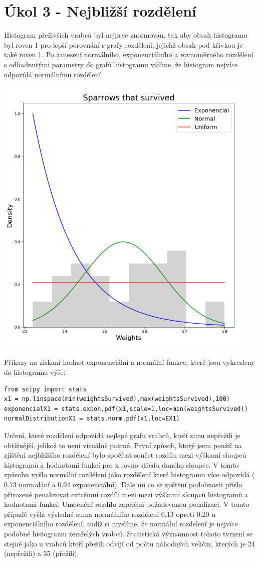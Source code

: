 \documentclass[12pt,a4paper]{article}
\begin{document}
\section{Úkol 3 - Nejbližší rozdělení}
Histogram přeživších vrabců byl nejprve znormován, tak aby obsah histogramu byl roven 1 pro lepší porovnání s grafy rozdělení, jejichž obsah pod křivkou je také roven 1. Po zanesení normálního, exponenciálního a rovnoměrného rozdělení s odhadnutými parametry do grafů histogramu vidíme, že histogram nejvíce odpovídá normálnímu rozdělení.
\begin{center}
\includegraphics[width=5in]{3_survived}
\end{center}
Příkazy na získaní hodnot exponenciální a normální funkce, které jsou vykresleny do histogramu výše:\par \medskip
\begin{lstlisting}
from scipy import stats
x1 = np.linspace(min(weightsSurvived),max(weightsSurvived),100)
exponencialX1 = stats.expon.pdf(x1,scale=1,loc=min(weightsSurvived))
normalDistributionX1 = stats.norm.pdf(x1,loc=EX1)
\end{lstlisting}
\pagebreak
Určení, které rozdělení odpovídá nejlepé grafu vrabců, kteří zimu nepřežili je obtížnější, jelikož to není visuálně patrné. První způsob, který jsem použil na zjištění nejbližšího rozdělení bylo spočítat součet rozdílu mezi výškami sloupců histogramů a hodnotami funkcí pro x rovno středu daného sloupce. V tomto způsobu vyšlo normální rozdělení jako rozdělení které histogramu více odpovídá ( 0.73 normalání a 0.94 exponenciální). Dále mi co se zjištění podobnosti přišlo přirozené penalizovat extrémní rozdíli  mezi mezi výškami sloupců histogramů a hodnotami funkcí. Umocnění rozdílu zapříčiní požadovanou penalizaci. V tomto případě vyšla výsledná suma normálního rozdělení 0.13 oproti 0.20 u exponenciálního rozdělení, tudíž si myslíme, že normální rozdelení je nejvíce podobné histogramu zemřelých vrabců. Statistická významnost tohoto tvrzení se stejně jako u vrabců kteří přežili odvíjí od počtu náhodných veličin, kterých je 24 (nepřežili) a 35 (přežili).
\end{document}
